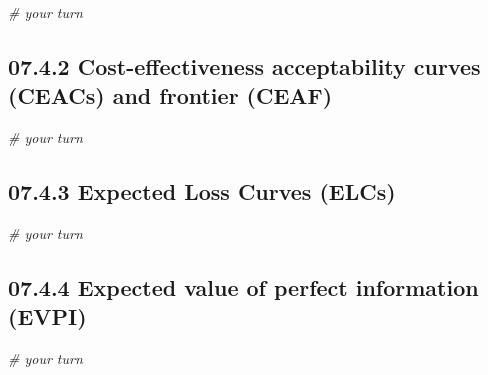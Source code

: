 \documentclass[
]{article}
\newenvironment{Shaded}{\begin{snugshade}}{\end{snugshade}}
\newcommand{\CommentTok}[1]{\textcolor[rgb]{0.56,0.35,0.01}{\textit{#1}}}
\begin{document}
\begin{Shaded}
\begin{Highlighting}[]
\CommentTok{# your turn}
\end{Highlighting}
\end{Shaded}

\hypertarget{cost-effectiveness-acceptability-curves-ceacs-and-frontier-ceaf}{%
\subsection{07.4.2 Cost-effectiveness acceptability curves (CEACs) and
frontier
(CEAF)}\label{cost-effectiveness-acceptability-curves-ceacs-and-frontier-ceaf}}

\begin{Shaded}
\begin{Highlighting}[]
\CommentTok{# your turn}
\end{Highlighting}
\end{Shaded}

\hypertarget{expected-loss-curves-elcs}{%
\subsection{07.4.3 Expected Loss Curves
(ELCs)}\label{expected-loss-curves-elcs}}

\begin{Shaded}
\begin{Highlighting}[]
\CommentTok{# your turn}
\end{Highlighting}
\end{Shaded}

\hypertarget{expected-value-of-perfect-information-evpi}{%
\subsection{07.4.4 Expected value of perfect information
(EVPI)}\label{expected-value-of-perfect-information-evpi}}

\begin{Shaded}
\begin{Highlighting}[]
\CommentTok{# your turn}
\end{Highlighting}
\end{Shaded}
\end{document}
